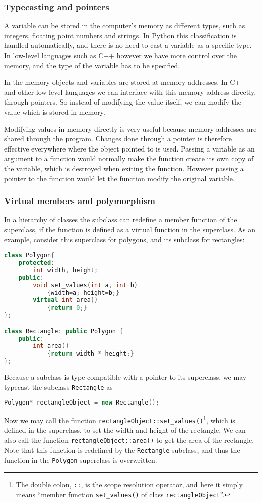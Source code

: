 	\subsubsection{Typecasting and pointers}
		A variable can be stored in the computer's memory as different types, such as integers, floating point numbers and strings. In Python this classification is handled automatically, and there is no need to cast a variable as a specific type. In low-level languages such as C++ however we have more control over the memory, and the type of the variable has to be specified. 

		In the memory objects and variables are stored at memory addresses. In C++ and other low-level languages we can interface with this memory address directly, through pointers. So instead of modifying the value itself, we can modify the value which is stored in memory.

		Modifying values in memory directly is very useful because memory addresses are shared through the program. Changes done through a pointer is therefore effective everywhere where the object pointed to is used. Passing a variable as an argument to a function would normally make the function create its own copy of the variable, which is destroyed when exiting the function. However passing a pointer to the function would let the function modify the original variable.

	\subsubsection{Virtual members and polymorphism}
		In a hierarchy of classes the subclass can redefine a member function of the superclass, if the function is defined as a virtual function in the superclass. As an example, consider this  superclass for polygons, and its subclass for rectangles:
		
\begin{lstlisting}[language=C++, firstnumber=1, framesep=0pt]
class Polygon{
	protected:
		int width, height;
	public:
		void set_values(int a, int b) 
			{width=a; height=b;}
		virtual int area() 
			{return 0;}
};

class Rectangle: public Polygon {
	public:
		int area()
			{return width * height;}
};
\end{lstlisting}
		Because a subclass is type-compatible with a pointer to its superclass, we may typecast the subclass {\tt Rectangle} as
\begin{lstlisting}[language=C++, firstnumber=1, framesep=0pt]
Polygon* rectangleObject = new Rectangle();
\end{lstlisting}
		Now we may call the function {\tt rectangleObject::set\_values()}\footnote{The double colon, {\tt ::}, is the scope resolution operator, and here it simply means ``member function {\tt set\_values()} of class {\tt rectangleObject}''.}, 
		which is defined in the superclass, to set the width and height of the rectangle. We can also call the function {\tt rectangleObject::area()} to get the area of the rectangle. Note that this function is redefined by the {\tt Rectangle} subclass, and thus the function in the {\tt Polygon} superclass is overwritten.

